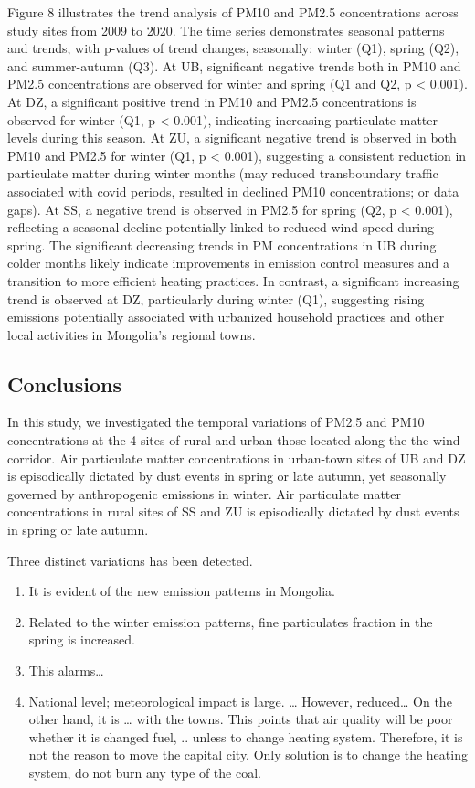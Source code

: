 \documentclass[
  11pt,
]{article}
\providecommand{\tightlist}{%
  \setlength{\itemsep}{0pt}\setlength{\parskip}{0pt}}
\begin{document}
Figure 8 illustrates the trend analysis of PM10 and PM2.5 concentrations
across study sites from 2009 to 2020. The time series demonstrates
seasonal patterns and trends, with p-values of trend changes,
seasonally: winter (Q1), spring (Q2), and summer-autumn (Q3). At UB,
significant negative trends both in PM10 and PM2.5 concentrations are
observed for winter and spring (Q1 and Q2, p \textless{} 0.001). At DZ,
a significant positive trend in PM10 and PM2.5 concentrations is
observed for winter (Q1, p \textless{} 0.001), indicating increasing
particulate matter levels during this season. At ZU, a significant
negative trend is observed in both PM10 and PM2.5 for winter (Q1, p
\textless{} 0.001), suggesting a consistent reduction in particulate
matter during winter months (may reduced transboundary traffic
associated with covid periods, resulted in declined PM10 concentrations;
or data gaps). At SS, a negative trend is observed in PM2.5 for spring
(Q2, p \textless{} 0.001), reflecting a seasonal decline potentially
linked to reduced wind speed during spring. The significant decreasing
trends in PM concentrations in UB during colder months likely indicate
improvements in emission control measures and a transition to more
efficient heating practices. In contrast, a significant increasing trend
is observed at DZ, particularly during winter (Q1), suggesting rising
emissions potentially associated with urbanized household practices and
other local activities in Mongolia's regional towns.

\subsection{Conclusions}\label{conclusions}

In this study, we investigated the temporal variations of PM2.5 and PM10
concentrations at the 4 sites of rural and urban those located along the
the wind corridor. Air particulate matter concentrations in urban-town
sites of UB and DZ is episodically dictated by dust events in spring or
late autumn, yet seasonally governed by anthropogenic emissions in
winter. Air particulate matter concentrations in rural sites of SS and
ZU is episodically dictated by dust events in spring or late autumn.

Three distinct variations has been detected.

\begin{enumerate}
\def\labelenumi{\arabic{enumi}.}
\tightlist
\item
  It is evident of the new emission patterns in Mongolia.
\item
  Related to the winter emission patterns, fine particulates fraction in
  the spring is increased.
\item
  This alarms\ldots{}
\item
  National level; meteorological impact is large. \ldots{} However,
  reduced\ldots{} On the other hand, it is \ldots{} with the towns. This
  points that air quality will be poor whether it is changed fuel, ..
  unless to change heating system. Therefore, it is not the reason to
  move the capital city. Only solution is to change the heating system,
  do not burn any type of the coal.
\end{enumerate}
\end{document}
